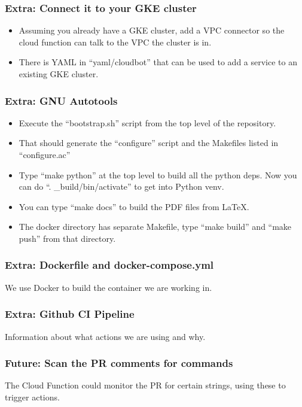 \documentclass[aspectratio=169]{beamer}
\begin{document}
\begin{frame}
	\frametitle{Extra: Connect it to your GKE cluster}
	\begin{itemize}
		\item Assuming you already have a GKE cluster, add a VPC connector so the cloud function can talk to the VPC the cluster is in.
		\item There is YAML in ``yaml/cloudbot'' that can be used to add a service to an existing GKE cluster.
	\end{itemize}
\end{frame}

\begin{frame}
	\frametitle{Extra: GNU Autotools}
	\begin{itemize}
		\item Execute the ``bootstrap.sh'' script from the top level of the repository.
		\item That should generate the ``configure'' script and the Makefiles listed in ``configure.ac''
		\item Type ``make python'' at the top level to build all the python deps. Now you can do ``. \_build/bin/activate'' to get into Python venv.
		\item You can type ``make docs'' to build the PDF files from  LaTeX.
		\item The docker directory has separate Makefile, type ``make build'' and ``make push'' from that directory.
	\end{itemize}
	\vspace{2mm}
\end{frame}

\begin{frame}
	\frametitle{Extra: Dockerfile and docker-compose.yml}
	We use Docker to build the container we are working in.
\end{frame}

\begin{frame}
	\frametitle{Extra: Github CI Pipeline}
	Information about what actions we are using and why.
\end{frame}

\begin{frame}
	\frametitle{Future: Scan the PR comments for commands}
	The Cloud Function could monitor the PR for certain strings, using these to trigger actions.
\end{frame}
\end{document}

